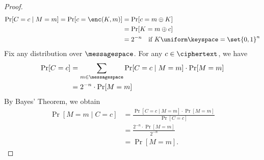 \begin{proof}
\begin{align*}
	\Pr[C=c\mid M=m]=\Pr[c=\enc(K,m)]&=\Pr[c=m\oplus K]\\
	&=\Pr[K=m\oplus c]\\
	&=2^{-n}\quad\text{if}\ K\uniform\keyspace=\set{0,1}^n
\end{align*} Fix any distribution over $\messagespace$. For any $c\in\ciphertext$, we have \begin{align*}
\Pr[C=c]&=\sum_{m\in\messagespace}\Pr[C=c\mid M=m]\cdot\Pr[M=m]\\
&=2^{-n}\cdot\Pr[M=m]
\end{align*} By Bayes' Theorem, we obtain \begin{align*}
\Pr[M=m\mid C=c]&=\frac{\Pr[C=c\mid M=m]\cdot\Pr[M=m]}{\Pr[C=c]}\\
&=\frac{2^{-n}\cdot\Pr[M=m]}{2^{-n}}\\
&=\Pr[M=m].
\end{align*}
\end{proof}
